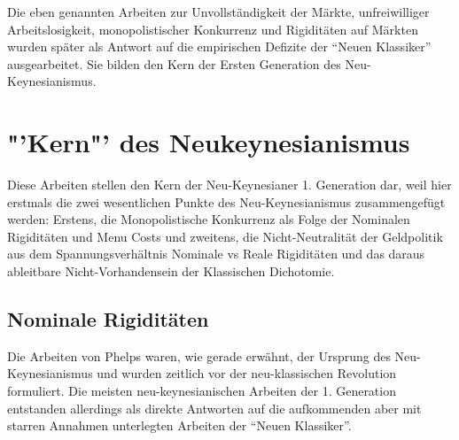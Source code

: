 Die eben genannten Arbeiten zur Unvollständigkeit der Märkte, unfreiwilliger Arbeitslosigkeit, monopolistischer Konkurrenz und Rigiditäten auf Märkten wurden später als Antwort auf die empirischen Defizite der "`Neuen Klassiker"' ausgearbeitet. Sie bilden den Kern der Ersten Generation des Neu-Keynesianismus.







\section{"'Kern"' des Neukeynesianismus}
\label{Kern}


Diese Arbeiten stellen den Kern der Neu-Keynesianer 1. Generation dar, weil hier erstmals die zwei wesentlichen Punkte des Neu-Keynesianismus zusammengefügt werden: Erstens, die Monopolistische Konkurrenz als Folge der Nominalen Rigiditäten und Menu Costs und zweitens, die Nicht-Neutralität der Geldpolitik aus dem Spannungsverhältnis Nominale vs Reale Rigiditäten und das daraus ableitbare Nicht-Vorhandensein der Klassischen Dichotomie. \parencite{RomerDavid1993}

\subsection{Nominale Rigiditäten}
\label{Nominale Rigiditäten}

Die Arbeiten von Phelps waren, wie gerade erwähnt, der Ursprung des Neu-Keynesianismus und wurden zeitlich vor der neu-klassischen Revolution formuliert. Die meisten neu-keynesianischen Arbeiten der 1. Generation entstanden allerdings als direkte Antworten auf die aufkommenden aber mit starren Annahmen unterlegten Arbeiten der "`Neuen Klassiker"'.

